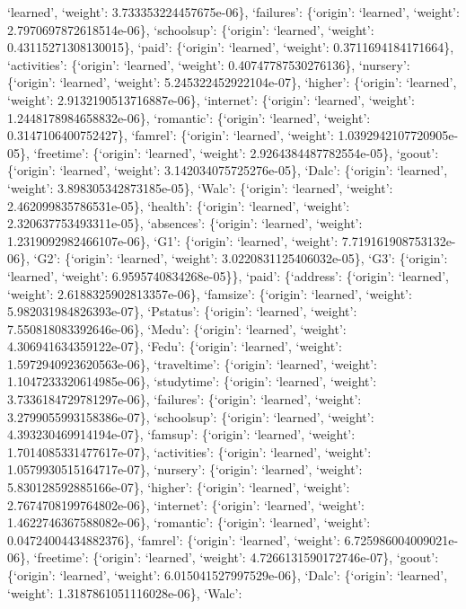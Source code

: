 \documentclass[
]{article}
\begin{document}
`learned', `weight': 3.733353224457675e-06\}, `failures': \{`origin':
`learned', `weight': 2.7970697872618514e-06\}, `schoolsup': \{`origin':
`learned', `weight': 0.43115271308130015\}, `paid': \{`origin':
`learned', `weight': 0.3711694184171664\}, `activities': \{`origin':
`learned', `weight': 0.40747787530276136\}, `nursery': \{`origin':
`learned', `weight': 5.245322452922104e-07\}, `higher': \{`origin':
`learned', `weight': 2.9132190513716887e-06\}, `internet': \{`origin':
`learned', `weight': 1.2448178984658832e-06\}, `romantic': \{`origin':
`learned', `weight': 0.3147106400752427\}, `famrel': \{`origin':
`learned', `weight': 1.0392942107720905e-05\}, `freetime': \{`origin':
`learned', `weight': 2.9264384487782554e-05\}, `goout': \{`origin':
`learned', `weight': 3.142034075725276e-05\}, `Dalc': \{`origin':
`learned', `weight': 3.898305342873185e-05\}, `Walc': \{`origin':
`learned', `weight': 2.462099835786531e-05\}, `health': \{`origin':
`learned', `weight': 2.320637753493311e-05\}, `absences': \{`origin':
`learned', `weight': 1.2319092982466107e-06\}, `G1': \{`origin':
`learned', `weight': 7.719161908753132e-06\}, `G2': \{`origin':
`learned', `weight': 3.0220831125406032e-05\}, `G3': \{`origin':
`learned', `weight': 6.9595740834268e-05\}\}, `paid': \{`address':
\{`origin': `learned', `weight': 2.6188325902813357e-06\}, `famsize':
\{`origin': `learned', `weight': 5.982031984826393e-07\}, `Pstatus':
\{`origin': `learned', `weight': 7.550818083392646e-06\}, `Medu':
\{`origin': `learned', `weight': 4.306941634359122e-07\}, `Fedu':
\{`origin': `learned', `weight': 1.5972940923620563e-06\}, `traveltime':
\{`origin': `learned', `weight': 1.1047233320614985e-06\}, `studytime':
\{`origin': `learned', `weight': 3.7336184729781297e-06\}, `failures':
\{`origin': `learned', `weight': 3.2799055993158386e-07\}, `schoolsup':
\{`origin': `learned', `weight': 4.393230469914194e-07\}, `famsup':
\{`origin': `learned', `weight': 1.7014085331477617e-07\}, `activities':
\{`origin': `learned', `weight': 1.0579930515164717e-07\}, `nursery':
\{`origin': `learned', `weight': 5.830128592885166e-07\}, `higher':
\{`origin': `learned', `weight': 2.7674708199764802e-06\}, `internet':
\{`origin': `learned', `weight': 1.4622746367588082e-06\}, `romantic':
\{`origin': `learned', `weight': 0.04724004434882376\}, `famrel':
\{`origin': `learned', `weight': 6.725986004009021e-06\}, `freetime':
\{`origin': `learned', `weight': 4.7266131590172746e-07\}, `goout':
\{`origin': `learned', `weight': 6.015041527997529e-06\}, `Dalc':
\{`origin': `learned', `weight': 1.3187861051116028e-06\}, `Walc':
\end{document}
